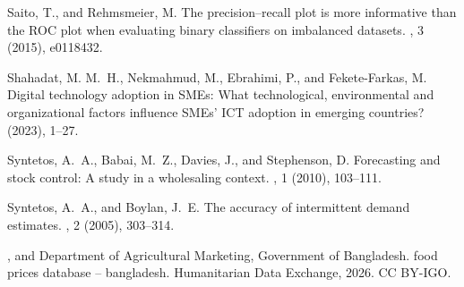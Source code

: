 \documentclass[a4paper,11pt,oneside]{book}
\theoremstyle{plain}
\theoremstyle{definition}
\theoremstyle{remark}
\renewcommand{\newblock}{\hspace{0.25em}}%
\begin{document}
\begin{thebibliography}{10}
{\sc Saito, T., and Rehmsmeier, M.}
\newblock The precision--recall plot is more informative than the {ROC} plot
  when evaluating binary classifiers on imbalanced datasets.
\newblock {\em PLOS ONE 10}, 3 (2015), e0118432.

{\sc Shahadat, M. M.~H., Nekmahmud, M., Ebrahimi, P., and Fekete-Farkas, M.}
\newblock Digital technology adoption in {SMEs}: What technological,
  environmental and organizational factors influence {SMEs}' {ICT} adoption in
  emerging countries?
\newblock {\em Global Business Review\/} (2023), 1--27.

{\sc Syntetos, A.~A., Babai, M.~Z., Davies, J., and Stephenson, D.}
\newblock Forecasting and stock control: A study in a wholesaling context.
\newblock {\em International Journal of Production Economics 127}, 1 (2010),
  103--111.

{\sc Syntetos, A.~A., and Boylan, J.~E.}
\newblock The accuracy of intermittent demand estimates.
\newblock {\em International Journal of Forecasting 21}, 2 (2005), 303--314.

{, and {Department of Agricultural Marketing,
  Government of Bangladesh}}.
\newblock {WFP} food prices database -- bangladesh.
\newblock Humanitarian Data Exchange, 2026.
\newblock CC BY-IGO.

\end{thebibliography}
\end{document}
